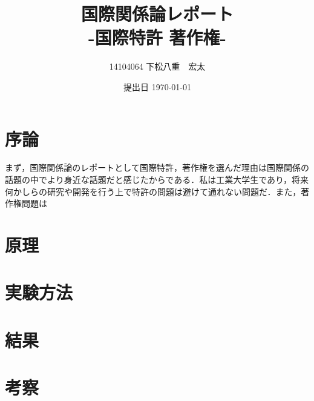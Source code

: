 \documentclass[11pt,a4paper]{jsarticle}
\begin{document}
\title{国際関係論レポート \\ -国際特許 著作権-}
\author{14104064 下松八重　宏太}
\date{提出日 \today}



\maketitle
\thispagestyle{empty}
\newpage


\section{序論}
まず，国際関係論のレポートとして国際特許，著作権を選んだ理由は国際関係の話題の中でより身近な話題だと感じたからである．私は工業大学生であり，将来何かしらの研究や開発を行う上で特許の問題は避けて通れない問題だ．また，著作権問題は
\section{原理}

\section{実験方法}

\section{結果}

\section{考察}
\end{document}
